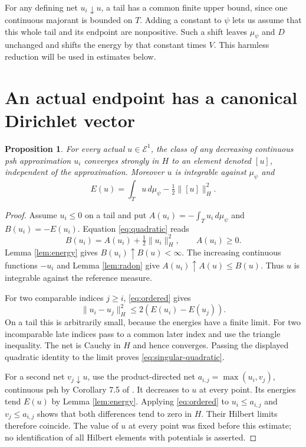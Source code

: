 \documentclass[11pt]{article}
\newtheorem{proposition}[theorem]{Proposition}
\newcommand{\E}{\mathcal E}
\begin{document}
For any defining net $u_i\downarrow u$, a tail has a common finite
upper bound, since one continuous majorant is bounded on $T$.
Adding a constant to $\psi$ lets us assume that this whole tail and
its endpoint are nonpositive. Such a shift leaves $\mu_\psi$ and
$D$ unchanged and shifts the energy by that constant times $V$.
This harmless reduction will be used in estimates below.

\section{An actual endpoint has a canonical Dirichlet vector}

\begin{proposition}\label{prop:vector}
For every actual $u\in\E^1$, the class of any decreasing continuous
psh approximation $u_i$ converges strongly in $H$ to an element
denoted $[u]$, independent of the approximation. Moreover $u$ is
integrable against $\mu_\psi$ and
\begin{equation}\label{eq:singular-quadratic}
 E(u)=\int_Tu\,d\mu_\psi-\tfrac12\|[u]\|_H^2.
\end{equation}
\end{proposition}
\begin{proof}
Assume $u_i\leq0$ on a tail and put
$A(u_i)=-\int_Tu_i\,d\mu_\psi$ and $B(u_i)=-E(u_i)$.
Equation \eqref{eq:quadratic} reads
\[
 B(u_i)=A(u_i)+\tfrac12\|u_i\|_H^2,
 \qquad A(u_i)\geq0.
\]
Lemma \ref{lem:energy} gives $B(u_i)\uparrow B(u)<\infty$.
The increasing continuous functions $-u_i$ and Lemma
\ref{lem:radon} give $A(u_i)\uparrow A(u)\leq B(u)$.
Thus $u$ is integrable against the reference measure.

For two comparable indices $j\geq i$, \eqref{eq:ordered} gives
\[
 \|u_i-u_j\|_H^2\leq2(E(u_i)-E(u_j)).
\]
On a tail this is arbitrarily small, because the energies have a
finite limit. For two incomparable late indices pass to a common
later index and use the triangle inequality. The net is Cauchy in
$H$ and hence converges. Passing the displayed quadratic identity
to the limit proves \eqref{eq:singular-quadratic}.

For a second net $v_j\downarrow u$, use the product-directed net
$a_{i,j}=\max(u_i,v_j)$, continuous psh by Corollary 7.5 of
\cite{BE}. It decreases to $u$ at every point. Its energies tend
$E(u)$ by Lemma \ref{lem:energy}. Applying
\eqref{eq:ordered} to $u_i\leq a_{i,j}$ and
$v_j\leq a_{i,j}$ shows that both differences tend to zero in
$H$. Their Hilbert limits therefore coincide. The value of $u$ at
every point was fixed before this estimate; no identification of
all Hilbert elements with potentials is asserted.
\end{proof}
\end{document}
